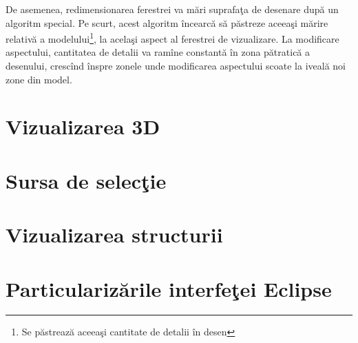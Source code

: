 De asemenea, redimensionarea ferestrei va mări suprafaţa de desenare după un
algoritm special. Pe scurt, acest algoritm încearcă să păstreze aceeaşi mărire
relativă a modelului\footnote{Se păstrează aceeaşi cantitate de detalii în
desen}, la acelaşi aspect al ferestrei de vizualizare. La modificare aspectului,
cantitatea de detalii va ramîne constantă în zona pătratică a desenului,
crescînd înspre zonele unde modificarea aspectului scoate la iveală noi zone din
model.

\section{Vizualizarea 3D}

\section{Sursa de selecţie}

\section{Vizualizarea structurii}

\section{Particularizările interfeţei Eclipse}

